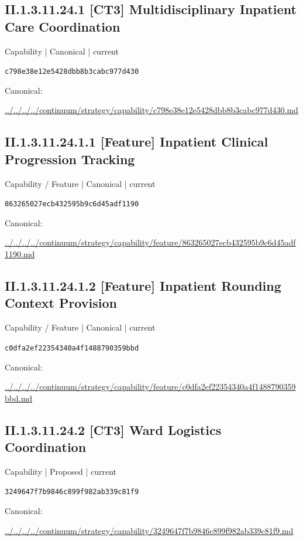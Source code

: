 \documentclass[10pt,a4paper]{article}
\begin{document}
\subsection*{II.1.3.11.24.1 [CT3] Multidisciplinary Inpatient Care Coordination}
{\small Capability | Canonical | current}\par
\texttt{c798e38e12e5428dbb8b3cabc977d430}\par
Canonical: \par
{\footnotesize\url{../../../../continuum/strategy/capability/c798e38e12e5428dbb8b3cabc977d430.md}}\par
\subsection*{II.1.3.11.24.1.1 [Feature] Inpatient Clinical Progression Tracking}
{\small Capability / Feature | Canonical | current}\par
\texttt{863265027ecb432595b9c6d45adf1190}\par
Canonical: \par
{\footnotesize\url{../../../../continuum/strategy/capability/feature/863265027ecb432595b9c6d45adf1190.md}}\par
\subsection*{II.1.3.11.24.1.2 [Feature] Inpatient Rounding Context Provision}
{\small Capability / Feature | Canonical | current}\par
\texttt{c0dfa2ef22354340a4f1488790359bbd}\par
Canonical: \par
{\footnotesize\url{../../../../continuum/strategy/capability/feature/c0dfa2ef22354340a4f1488790359bbd.md}}\par
\subsection*{II.1.3.11.24.2 [CT3] Ward Logistics Coordination}
{\small Capability | Proposed | current}\par
\texttt{3249647f7b9846c899f982ab339c81f9}\par
Canonical: \par
{\footnotesize\url{../../../../continuum/strategy/capability/3249647f7b9846c899f982ab339c81f9.md}}\par
\end{document}
